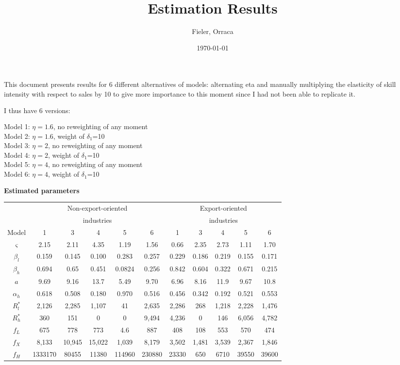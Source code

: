 \documentclass[12pt]{article}
\title{Estimation Results}
\author{Fieler, Orraca}
\date{\today}
\begin{document}
\maketitle
\normalsize

This document presents results for 6 different alternatives of models: alternating eta and manually multiplying the elasticity of skill intensity with respect to sales by 10 to give more importance to this moment since I had not been able to replicate it. 

I thus have 6 versions:

Model 1: $\eta=1.6$, no reweighting of any moment\\
Model 2: $\eta=1.6$, weight of $\delta_1$=10\\
Model 3: $\eta=2$, no reweighting of any moment\\ 
Model 4: $\eta=2$, weight of $\delta_1$=10\\
Model 5: $\eta=4$, no reweighting of any moment \\
Model 6: $\eta=4$, weight of $\delta_1$=10\\
\begin{landscape}
\begin{center}
{\bf Estimated parameters} \\
\begin{tabular}{ c c c c c c c c c c c } \hline
& \multicolumn{5}{c}{Non-export-oriented} & \multicolumn{5}{c}{Export-oriented}\\
& \multicolumn{5}{c}{industries} & \multicolumn{5}{c}{industries} \\  
Model & 1 & 3 & 4 & 5 & 6 & 1 & 3 & 4 & 5 & 6 \\ \hline \hline \bigskip
 $\varsigma$ & 2.15 & 2.11 & 4.35 & 1.19 & 1.56 & 0.66 & 2.35 & 2.73 & 1.11 & 1.70 \\ \bigskip 
 $\beta_l$ & 0.159 & 0.145 & 0.100 &0.283 & 0.257 & 0.229 & 0.186 & 0.219 & 0.155 & 0.171 \\  \bigskip
$\beta_h$ & 0.694 & 0.65 &0.451 &0.0824 & 0.256 & 0.842 & 0.604 & 0.322 & 0.671 & 0.215 \\ \bigskip
$a$ & 9.69 & 9.16 & 13.7 & 5.49 & 9.70 & 6.96 & 8.16 & 11.9 & 9.67 & 10.8 \\ \bigskip
$\alpha_h$ & 0.618 & 0.508 & 0.180 & 0.970 & 0.516 & 0.456 & 0.342 & 0.192 & 0.521 & 0.553 \\ \bigskip
$R_l^ *$ &2,126 & 2,285 & 1,107 & 41 & 2,635 &2,286 & 268 & 1,218 & 2,228 & 1,476 \\ \bigskip
$R_h^ *$ & 360 & 151 & 0 & 0 & 9,494 & 4,236 & 0 & 146 & 6,056 & 4,782 \\ \bigskip
$f_L$ & 675 & 778 & 773 & 4.6 & 887 & 408 & 108 & 553 & 570 & 474 \\ \bigskip
$f_X$ & 8,133 & 10,945 & 15,022 & 1,039 & 8,179 & 3,502 & 1,481 & 3,539 & 2,367 & 1,846 \\ \bigskip
$f_H$ & 1333170 & 80455 & 11380 & 114960 & 230880 & 23330 & 650 & 6710 & 39550 & 39600 \\ \hline
\end{tabular}
\end{center}
\end{landscape}
\end{document}
